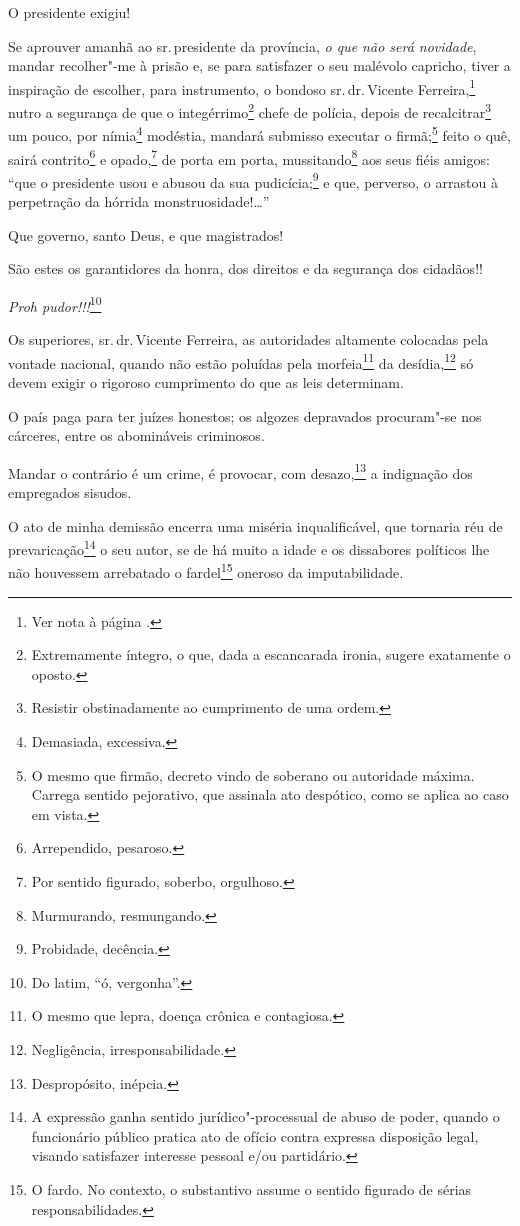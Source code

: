 O presidente exigiu!

Se aprouver amanhã ao sr.\,presidente da província, \emph{o que não será
novidade}, mandar recolher"-me à prisão e, se para satisfazer o seu
malévolo capricho, tiver a inspiração de escolher, para instrumento, o
bondoso sr.\,dr.\,Vicente Ferreira,\footnote{Ver nota à página \pageref{bueno}.} nutro a segurança de que o
integérrimo\footnote{Extremamente íntegro, o que, dada a escancarada
  ironia, sugere exatamente o oposto.} chefe de polícia, depois de
recalcitrar\footnote{Resistir obstinadamente ao cumprimento de uma
  ordem.} um pouco, por nímia\footnote{Demasiada, excessiva.}
modéstia, mandará submisso executar o firmã;\footnote{O mesmo que
  firmão, decreto vindo de soberano ou autoridade máxima. Carrega
  sentido pejorativo, que assinala ato despótico, como se aplica ao caso
  em vista.} feito o quê, sairá contrito\footnote{Arrependido,
  pesaroso.} e opado,\footnote{Por sentido figurado, soberbo,
  orgulhoso.} de porta em porta, mussitando\footnote{Murmurando,
  resmungando.} aos seus fiéis amigos: ``que o presidente usou e abusou
da sua pudicícia;\footnote{Probidade, decência.} e que, perverso, o
arrastou à perpetração da hórrida monstruosidade!\ldots{}''

Que governo, santo Deus, e que magistrados!

São estes os garantidores da honra, dos direitos e da segurança dos
cidadãos!!

\emph{Proh pudor!!!}\footnote{Do latim, ``ó, vergonha''.}

Os superiores, sr.\,dr.\,Vicente Ferreira, as autoridades altamente
colocadas pela vontade nacional, quando não estão poluídas pela
morfeia\footnote{O mesmo que lepra, doença crônica e contagiosa.} da
desídia,\footnote{Negligência, irresponsabilidade.} só devem exigir o
rigoroso cumprimento do que as leis determinam.

O país paga para ter juízes honestos; os algozes depravados procuram"-se
nos cárceres, entre os abomináveis criminosos.

Mandar o contrário é um crime, é provocar, com desazo,\footnote{
  Despropósito, inépcia.} a indignação dos empregados sisudos.

O ato de minha demissão encerra uma miséria inqualificável, que tornaria
réu de prevaricação\footnote{A expressão ganha sentido
  jurídico"-processual de abuso de poder, quando o funcionário público
  pratica ato de ofício contra expressa disposição legal, visando
  satisfazer interesse pessoal e/ou partidário.} o seu autor, se de há
muito a idade e os dissabores políticos lhe não houvessem arrebatado o
fardel\footnote{O fardo. No contexto, o substantivo assume o
  sentido figurado de sérias responsabilidades.} oneroso da
imputabilidade.

